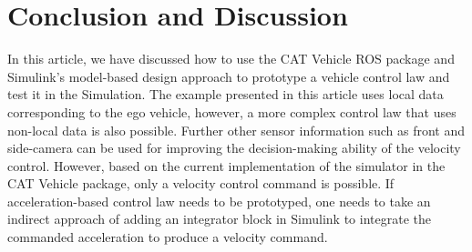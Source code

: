 \documentclass[
]{article}
\begin{document}
\hypertarget{conclusion-and-discussion}{%
\section{Conclusion and Discussion}\label{conclusion-and-discussion}}


 
In this article, we have discussed how to use the CAT Vehicle ROS
package and Simulink's model-based design approach to prototype a
vehicle control law and test it in the Simulation. The example presented
in this article uses local data corresponding to the ego vehicle,
however, a more complex control law that uses non-local data is also
possible. Further other sensor information such as front and side-camera
can be used for improving the decision-making ability of the velocity
control. However, based on the current implementation of the simulator
in the CAT Vehicle package, only a velocity control command is possible.
If acceleration-based control law needs to be prototyped, one needs to
take an indirect approach of adding an integrator block in Simulink to
integrate the commanded acceleration to produce a velocity command.


 
 
\end{document}
